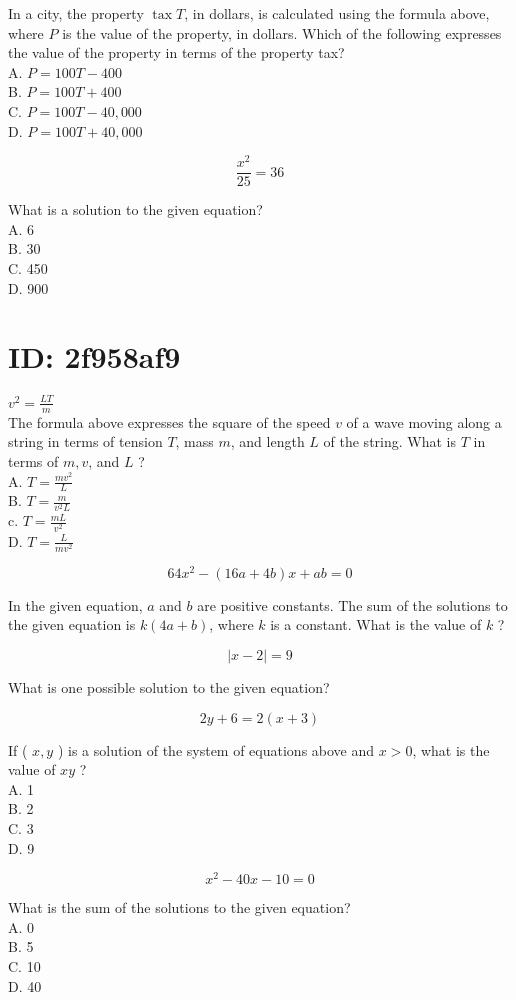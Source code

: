 In a city, the property $\operatorname{tax} T$, in dollars, is calculated using the formula above, where $P$ is the value of the property, in dollars. Which of the following expresses the value of the property in terms of the property tax?\\
A. $P=100 T-400$\\
B. $P=100 T+400$\\
C. $P=100 T-40,000$\\
D. $P=100 T+40,000$

$$
\frac{x^{2}}{25}=36
$$

What is a solution to the given equation?\\
A. 6\\
B. 30\\
C. 450\\
D. 900

\section*{ID: 2f958af9}
$v^{2}=\frac{L T}{m}$\\
The formula above expresses the square of the speed $v$ of a wave moving along a string in terms of tension $T$, mass $m$, and length $L$ of the string. What is $T$ in terms of $m, v$, and $L$ ?\\
A. $T=\frac{m v^{2}}{L}$\\
B. $T=\frac{m}{v^{2} L}$\\
c. $T=\frac{m L}{v^{2}}$\\
D. $T=\frac{L}{m v^{2}}$

$$
64 x^{2}-(16 a+4 b) x+a b=0
$$

In the given equation, $a$ and $b$ are positive constants. The sum of the solutions to the given equation is $k(4 a+b)$, where $k$ is a constant. What is the value of $k$ ?

$$
|x-2|=9
$$

What is one possible solution to the given equation?

$$
2 y+6=2(x+3)
$$

If ( $x, y$ ) is a solution of the system of equations above and $x>0$, what is the value of $x y$ ?\\
A. 1\\
B. 2\\
C. 3\\
D. 9

$$
x^{2}-40 x-10=0
$$

What is the sum of the solutions to the given equation?\\
A. 0\\
B. 5\\
C. 10\\
D. 40

